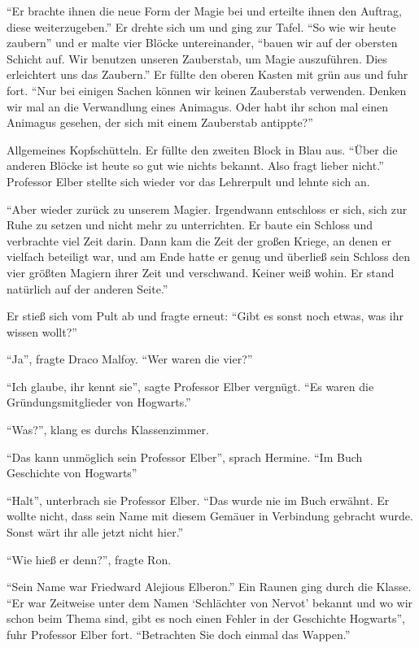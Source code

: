 \enquote{Er brachte ihnen die neue Form der Magie bei und erteilte ihnen den Auftrag, diese weiterzugeben.} Er drehte sich um und ging zur Tafel. \enquote{So wie wir heute zaubern} und er malte vier Blöcke untereinander, \enquote{bauen wir auf der obersten Schicht auf. Wir benutzen unseren Zauberstab, um Magie auszuführen. Dies erleichtert uns das Zaubern.} Er füllte den oberen Kasten mit grün aus und fuhr fort. \enquote{Nur bei einigen Sachen können wir keinen Zauberstab verwenden. Denken wir mal an die Verwandlung eines Animagus. Oder habt ihr schon mal einen Animagus gesehen, der sich mit einem Zauberstab antippte?}

Allgemeines Kopfschütteln. Er füllte den zweiten Block in Blau aus. \enquote{Über die anderen Blöcke ist heute so gut wie nichts bekannt. Also fragt lieber nicht.} Professor Elber stellte sich wieder vor das Lehrerpult und lehnte sich an.

\enquote{Aber wieder zurück zu unserem Magier. Irgendwann entschloss er sich, sich zur Ruhe zu setzen und nicht mehr zu unterrichten. Er baute ein Schloss und verbrachte viel Zeit darin. Dann kam die Zeit der großen Kriege, an denen er vielfach beteiligt war, und am Ende hatte er genug und überließ sein Schloss den vier größten Magiern ihrer Zeit und verschwand. Keiner weiß wohin. Er stand natürlich auf der anderen Seite.}

Er stieß sich vom Pult ab und fragte erneut: \enquote{Gibt es sonst noch etwas, was ihr wissen wollt?}

\enquote{Ja}, fragte Draco Malfoy. \enquote{Wer waren die vier?}

\enquote{Ich glaube, ihr kennt sie}, sagte Professor Elber vergnügt. \enquote{Es waren die Gründungsmitglieder von Hogwarts.}

\enquote{Was?}, klang es durchs Klassenzimmer.

\enquote{Das kann unmöglich sein Professor Elber}, sprach Hermine. \enquote{Im Buch Geschichte von Hogwarts\abs}

\enquote{Halt}, unterbrach sie Professor Elber. \enquote{Das wurde nie im Buch erwähnt. Er wollte nicht, dass sein Name mit diesem Gemäuer in Verbindung gebracht wurde. Sonst wärt ihr alle jetzt nicht hier.}

\enquote{Wie hieß er denn?}, fragte Ron.

\enquote{Sein Name war Friedward Alejious Elberon.} Ein Raunen ging durch die Klasse. \enquote{Er war Zeitweise unter dem Namen \enquote{Schlächter von Nervot} bekannt und wo wir schon beim Thema sind, gibt es noch einen Fehler in der Geschichte Hogwarts}, fuhr Professor Elber fort. \enquote{Betrachten Sie doch einmal das Wappen.}

